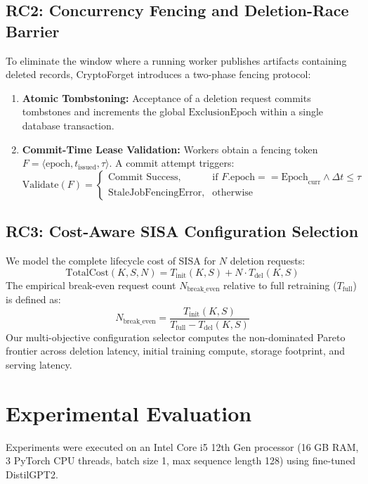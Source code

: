 \documentclass[10pt,journal,compsoc]{IEEEtran}
\begin{document}
\subsection{RC2: Concurrency Fencing and Deletion-Race Barrier}
To eliminate the window where a running worker publishes artifacts containing deleted records, CryptoForget introduces a two-phase fencing protocol:
\begin{enumerate}
    \item \textbf{Atomic Tombstoning:} Acceptance of a deletion request commits tombstones and increments the global $\text{ExclusionEpoch}$ within a single database transaction.
    \item \textbf{Commit-Time Lease Validation:} Workers obtain a fencing token $F = \langle \text{epoch}, t_{\text{issued}}, \tau \rangle$. A commit attempt triggers:
    \begin{equation}
    \text{Validate}(F) = \begin{cases} 
    \text{Commit Success}, & \text{if } F.\text{epoch} == \text{Epoch}_{\text{curr}} \land \Delta t \le \tau \\ 
    \text{StaleJobFencingError}, & \text{otherwise} 
    \end{cases}
    \end{equation}
\end{enumerate}

\subsection{RC3: Cost-Aware SISA Configuration Selection}
We model the complete lifecycle cost of SISA for $N$ deletion requests:
\begin{equation}
\text{TotalCost}(K, S, N) = T_{\text{init}}(K,S) + N \cdot T_{\text{del}}(K,S)
\end{equation}
The empirical break-even request count $N_{\text{break\_even}}$ relative to full retraining ($T_{\text{full}}$) is defined as:
\begin{equation}
N_{\text{break\_even}} = \frac{T_{\text{init}}(K,S)}{T_{\text{full}} - T_{\text{del}}(K,S)}
\end{equation}
Our multi-objective configuration selector computes the non-dominated Pareto frontier across deletion latency, initial training compute, storage footprint, and serving latency.

\section{Experimental Evaluation}
Experiments were executed on an Intel Core i5 12th Gen processor (16 GB RAM, 3 PyTorch CPU threads, batch size 1, max sequence length 128) using fine-tuned DistilGPT2.
\end{document}
